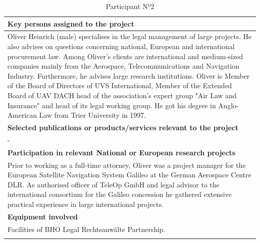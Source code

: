 \begin{longtable}[H]{|p{0.7cm}|p{4cm}|p{7cm}|p{1.3cm}|}
	\multicolumn{4}{|p{13cm}|}{\textbf{Key persons assigned to the project}}   \\ \hline
	
	\multicolumn{4}{|p{14.5cm}|}{Oliver Heinrich (male) specialises in the legal management of large projects. He also advises on questions concerning national, European and international procurement law. Among Oliver's clients are international and medium-sized companies mainly from the Aerospace, Telecommunications and Navigation Industry. Furthermore, he advises large research institutions. Oliver is Member of the Board of Directors of UVS International, Member of the Extended Board of UAV DACH head of the association’s expert group "Air Law and Insurance" and head of its legal working group. He got his degree in Anglo-American Law from Trier University in 1997.}  \\ \hline
	
	\multicolumn{4}{|p{13cm}|}{\textbf{Selected publications or products/services relevant to the project}}  \\ \hline
	
	\multicolumn{4}{|p{14.5cm}|}{-}  \\ \hline
	
	\multicolumn{4}{|p{13cm}|}{\textbf{Participation in relevant National or European research projects}}  \\ \hline
	
	\multicolumn{4}{|p{14.5cm}|}{Prior to working as a full-time attorney, Oliver was a project manager for the European Satellite Navigation System Galileo at the German Aerospace Centre DLR. As authorised officer of TeleOp GmbH and legal advisor to the international consortium for the Galileo concession he gathered extensive practical experience in large international projects. }  \\ \hline
	
	\multicolumn{4}{|p{13cm}|}{\textbf{Equipment involved}}  \\ \hline
	
	\multicolumn{4}{|p{14.5cm}|}{Facilities of BHO Legal Rechtsanwälte Partnership.}  \\ \hline
	\caption{Participant Nº2}
\end{longtable}

